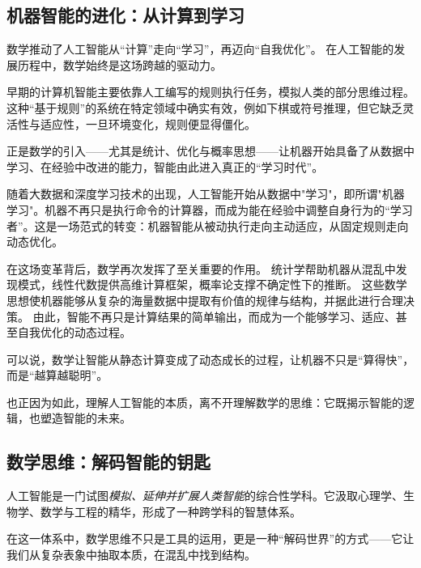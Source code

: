 \subsection{机器智能的进化：从计算到学习}

数学推动了人工智能从“计算”走向“学习”，再迈向“自我优化”。
在人工智能的发展历程中，数学始终是这场跨越的驱动力。

早期的计算机智能主要依靠人工编写的规则执行任务，模拟人类的部分思维过程。
这种“基于规则”的系统在特定领域中确实有效，例如下棋或符号推理，但它缺乏灵活性与适应性，一旦环境变化，规则便显得僵化。

正是数学的引入——尤其是统计、优化与概率思想——让机器开始具备了从数据中学习、在经验中改进的能力，智能由此进入真正的“学习时代”。


随着大数据和深度学习技术的出现，人工智能开始从数据中"学习"，即所谓"机器学习"。机器不再只是执行命令的计算器，而成为能在经验中调整自身行为的“学习者”。这是一场范式的转变：机器智能从被动执行走向主动适应，从固定规则走向动态优化。

在这场变革背后，数学再次发挥了至关重要的作用。
统计学帮助机器从混乱中发现模式，线性代数提供高维计算框架，概率论支撑不确定性下的推断。
这些数学思想使机器能够从复杂的海量数据中提取有价值的规律与结构，并据此进行合理决策。
由此，智能不再只是计算结果的简单输出，而成为一个能够学习、适应、甚至自我优化的动态过程。

可以说，数学让智能从静态计算变成了动态成长的过程，让机器不只是“算得快”，而是“越算越聪明”。

也正因为如此，理解人工智能的本质，离不开理解数学的思维：它既揭示智能的逻辑，也塑造智能的未来。

\subsection{数学思维：解码智能的钥匙}
人工智能是一门试图\emph{模拟、延伸并扩展人类智能}的综合性学科。它汲取心理学、生物学、数学与工程的精华，形成了一种跨学科的智慧体系。

在这一体系中，数学思维不只是工具的运用，更是一种“解码世界”的方式——它让我们从复杂表象中抽取本质，在混乱中找到结构。


